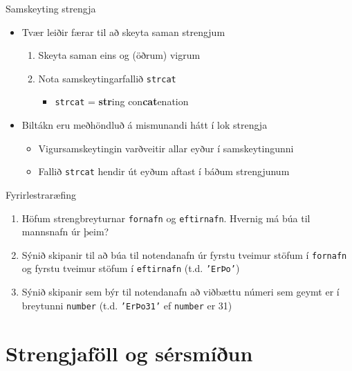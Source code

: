 \documentclass[handout]{beamer}
\begin{document}
\begin{frame}{Samskeyting strengja}
\begin{itemize}
 \item Tvær leiðir færar til að skeyta saman strengjum
 \begin{enumerate}
  \item Skeyta saman eins og (öðrum) vigrum
  \item Nota samskeytingarfallið \texttt{strcat}
  \begin{itemize}
   \item \texttt{strcat} = \textbf{str}ing con\textbf{cat}enation
  \end{itemize}  
 \end{enumerate}
 \item Biltákn eru meðhöndluð á mismunandi hátt í lok strengja
 \begin{itemize}
  \item Vigursamskeytingin varðveitir allar eyður í samskeytingunni
  \item Fallið \texttt{strcat} hendir út eyðum aftast í báðum strengjunum
 \end{itemize}
\end{itemize}
\end{frame}

\begin{frame}{Fyrirlestraræfing}
    \begin{enumerate}
        \item Höfum strengbreyturnar \texttt{fornafn} og \texttt{eftirnafn}. Hvernig má búa til mannsnafn úr þeim?
        \item Sýnið skipanir til að búa til notendanafn úr fyrstu tveimur stöfum í \texttt{fornafn} og fyrstu tveimur stöfum í \texttt{eftirnafn} (t.d. \texttt{'ErÞo'})
        \item Sýnið skipanir sem býr til notendanafn að viðbættu númeri sem geymt er í breytunni \texttt{number} (t.d. \texttt{'ErÞo31'} ef \texttt{number} er 31)
    \end{enumerate}    
\end{frame}

\section{Strengjaföll og sérsmíðun}
\end{document}
